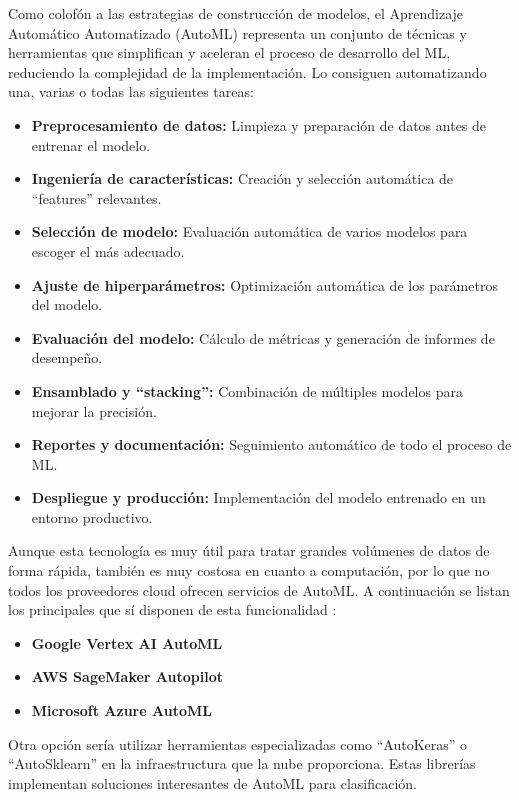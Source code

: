 Como colofón a las estrategias de construcción de modelos, el Aprendizaje Automático Automatizado (AutoML) representa un conjunto de técnicas y herramientas que simplifican y aceleran el proceso de desarrollo del ML, reduciendo la complejidad de la implementación. Lo consiguen automatizando una, varias o todas las siguientes tareas:
\begin{itemize}
	\item \textbf{Preprocesamiento de datos:} Limpieza y preparación de datos antes de entrenar el modelo.
	\item \textbf{Ingeniería de características:} Creación y selección automática de ``features'' relevantes.
	\item \textbf{Selección de modelo:} Evaluación automática de varios modelos para escoger el más adecuado.
	\item \textbf{Ajuste de hiperparámetros:} Optimización automática de los parámetros del modelo.
	\item \textbf{Evaluación del modelo:} Cálculo de métricas y generación de informes de desempeño.
	\item \textbf{Ensamblado y ``stacking'':} Combinación de múltiples modelos para mejorar la precisión.
	\item \textbf{Reportes y documentación:} Seguimiento automático de todo el proceso de ML.
	\item \textbf{Despliegue y producción:} Implementación del modelo entrenado en un entorno productivo.
\end{itemize}

Aunque esta tecnología es muy útil para tratar grandes volúmenes de datos de forma rápida, también es muy costosa en cuanto a computación, por lo que no todos los proveedores cloud ofrecen servicios de AutoML. A continuación se listan los principales que sí disponen de esta funcionalidad \citep{comparisonAutoMLServices}:
\begin{itemize}
	\item \textbf{Google Vertex AI AutoML} 
	\item \textbf{AWS SageMaker Autopilot} 
	\item \textbf{Microsoft Azure AutoML}
\end{itemize}

Otra opción sería utilizar herramientas especializadas como ``AutoKeras'' \citep{AutoKerasAutoML} o ``AutoSklearn'' \citep{AutoSklearnAutoML} en la infraestructura que la nube proporciona. Estas librerías implementan soluciones interesantes de AutoML para clasificación.

